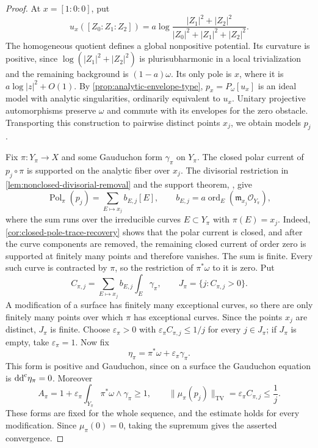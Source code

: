 \begin{proof}
At $x=[1:0:0]$, put
\[
 u_x([Z_0:Z_1:Z_2])
   =a\log\frac{|Z_1|^2+|Z_2|^2}
                    {|Z_0|^2+|Z_1|^2+|Z_2|^2}.
\]
The homogeneous quotient defines a global nonpositive potential. Its curvature is positive, since $\log(|Z_1|^2+|Z_2|^2)$ is plurisubharmonic in a local trivialization and the remaining background is $(1-a)\omega$. Its only pole is $x$, where it is $a\log|z|^2+O(1)$. By \cref{prop:analytic-envelope-type}, $p_x=P_\omega[u_x]$ is an ideal model with analytic singularities, ordinarily equivalent to $u_x$. Unitary projective automorphisms preserve $\omega$ and commute with its envelopes for the zero obstacle. Transporting this construction to pairwise distinct points $x_j$, we obtain models $p_j$.

Fix $\pi\colon Y_\pi\to X$ and some Gauduchon form $\gamma_\pi$ on $Y_\pi$. The closed polar current of $p_j\circ\pi$ is supported on the analytic fiber over $x_j$. The divisorial restriction in \cref{lem:nonclosed-divisorial-removal} and the support theorem, \cite[Chapter III, Corollaries 2.11 and 2.14, pp.~141--143]{DemCADG}, give
\[
 \operatorname{Pol}_\pi(p_j)
    =\sum_{E\mapsto x_j}b_{E,j}[E],
 \qquad b_{E,j}=a\operatorname{ord}_E
                         (\mathfrak m_{x_j}\mathcal O_{Y_\pi}),
\]
where the sum runs over the irreducible curves $E\subset Y_\pi$ with $\pi(E)=x_j$. Indeed, \cref{cor:closed-pole-trace-recovery} shows that the polar current is closed, and after the curve components are removed, the remaining closed current of order zero is supported at finitely many points and therefore vanishes. The sum is finite. Every such curve is contracted by $\pi$, so the restriction of $\pi^*\omega$ to it is zero. Put
\[
 C_{\pi,j}=\sum_{E\mapsto x_j}b_{E,j}\int_E\gamma_\pi,
 \qquad J_\pi=\{j:C_{\pi,j}>0\}.
\]
A modification of a surface has finitely many exceptional curves, so there are only finitely many points over which $\pi$ has exceptional curves. Since the points $x_j$ are distinct, $J_\pi$ is finite. Choose $\varepsilon_\pi>0$ with $\varepsilon_\pi C_{\pi,j}\leq1/j$ for every $j\in J_\pi$; if $J_\pi$ is empty, take $\varepsilon_\pi=1$. Now fix
\[
 \eta_\pi=\pi^*\omega+\varepsilon_\pi\gamma_\pi.
\]
This form is positive and Gauduchon, since on a surface the Gauduchon equation is $\mathrm{dd}^{\mathrm{c}}\eta_\pi=0$. Moreover
\[
 A_\pi=1+\varepsilon_\pi
                  \int_{Y_\pi}\pi^*\omega\wedge\gamma_\pi\geq1,
 \qquad \|\mu_\pi(p_j)\|_{\mathrm{TV}}
                  =\varepsilon_\pi C_{\pi,j}\leq\frac1j.
\]
These forms are fixed for the whole sequence, and the estimate holds for every modification. Since $\mu_\pi(0)=0$, taking the supremum gives the asserted convergence.


\end{proof}
